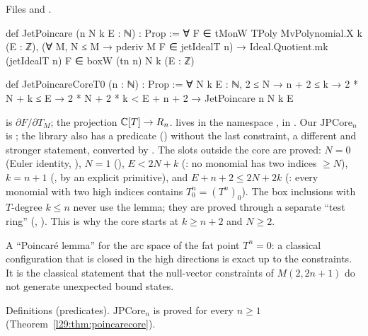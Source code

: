 \noindent Files  and
.
\begin{leancode}
def JetPoincare (n N k E : ℕ) : Prop :=
  ∀ F ∈ tMonW TPoly MvPolynomial.X k (E : ℤ), (∀ M, N ≤ M → pderiv M F ∈ jetIdealT n) →
    Ideal.Quotient.mk (jetIdealT n) F ∈ boxW (tn n) N k (E : ℤ)

def JetPoincareCoreT0 (n : ℕ) : Prop :=
  ∀ N k E : ℕ, 2 ≤ N → n + 2 ≤ k → 2 * N + k ≤ E → 2 * N + 2 * k < E + n + 2 →
    JetPoincare n N k E
\end{leancode}

\begin{dictionary}
 is $\partial F/\partial T_M$;  the projection ${\mathbb{C}}[T]\to R_n$.
 lives in the namespace ,  in
. Our $\mathrm{JPCore}_n$ is ; the library also
has a predicate  () without the last constraint, a different and
stronger statement, converted by . The slots outside the core are proved: $N=0$ (Euler identity,
), $N=1$ (), $E<2N+k$ (: no monomial has two
indices $\ge N$), $k=n+1$ (, by an explicit primitive), and $E+n+2\le2N+2k$
(: every monomial with two high indices contains $T_0^n=(T^n)_0$). The box inclusions with
$T$-degree $k\le n$ never use the lemma; they are proved through a separate ``test ring''
(, ). This is why the core starts at $k\ge n+2$ and $N\ge2$.
\end{dictionary}

\begin{physics}
A ``Poincar\'e lemma'' for the arc space of the fat point $T^n=0$: a classical configuration that is closed in the high
directions is exact up to the constraints. It is the classical statement that the null-vector constraints of
$M(2,2n+1)$ do not generate unexpected bound states.
\end{physics}

\begin{status}
Definitions (predicates). $\mathrm{JPCore}_n$ is proved for every $n\ge1$ (Theorem~\ref{l29:thm:poincarecore}).
\end{status}

